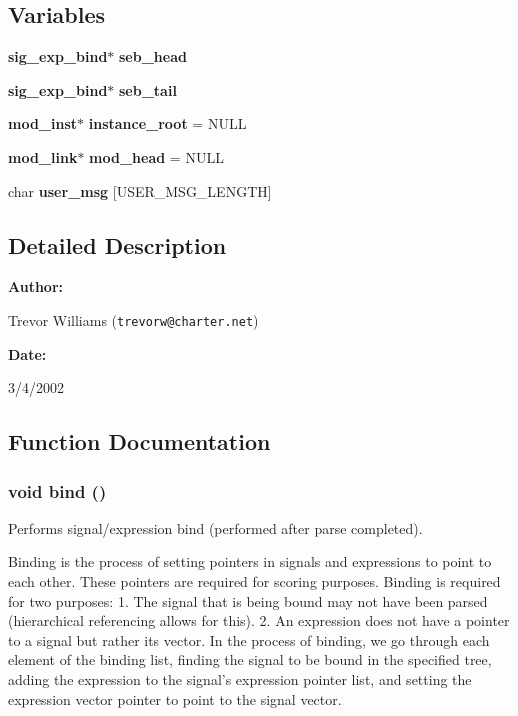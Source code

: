 \subsection*{Variables}
\begin{CompactItemize}
\item 
{\bf sig\_\-exp\_\-bind}$\ast$ {\bf seb\_\-head}
\item 
{\bf sig\_\-exp\_\-bind}$\ast$ {\bf seb\_\-tail}
\item 
{\bf mod\_\-inst}$\ast$ {\bf instance\_\-root} = NULL
\item 
{\bf mod\_\-link}$\ast$ {\bf mod\_\-head} = NULL
\item 
char {\bf user\_\-msg} [USER\_\-MSG\_\-LENGTH]
\end{CompactItemize}


\subsection{Detailed Description}


\begin{Desc}
\item[{\bf Author: }]\par
Trevor Williams ({\tt trevorw@charter.net}) \end{Desc}
\begin{Desc}
\item[{\bf Date: }]\par
3/4/2002

\end{Desc}


\subsection{Function Documentation}
\subsubsection{\setlength{\rightskip}{0pt plus 5cm}void bind ()}\label{binding_8c_a8}


Performs signal/expression bind (performed after parse completed).

Binding is the process of setting pointers in signals and expressions to point to each other. These pointers are required for scoring purposes. Binding is required for two purposes: 1. The signal that is being bound may not have been parsed (hierarchical referencing allows for this). 2. An expression does not have a pointer to a signal but rather its vector. In the process of binding, we go through each element of the binding list, finding the signal to be bound in the specified tree, adding the expression to the signal's expression pointer list, and setting the expression vector pointer to point to the signal vector. 
